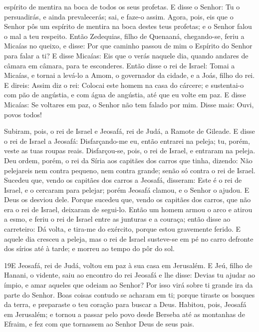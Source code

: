 espírito de mentira na boca de todos os seus profetas. E disse o
Senhor: Tu o persuadirás, e ainda prevalecerás; sai, e faze-o assim.
Agora, pois, eis que o Senhor pôs um espírito de mentira na
boca destes teus profetas; e o Senhor falou o mal a teu respeito.
Então Zedequias, filho de Quenaaná, chegando-se, feriu a
Micaías no queixo, e disse: Por que caminho passou de mim o Espírito
do Senhor para falar a ti? E disse Micaías: Eis que o verás
naquele dia, quando andares de câmara em câmara, para te esconderes.
 Então disse o rei de Israel: Tomai a Micaías, e tornai a levá-lo
a Amom, o governador da cidade, e a Joás, filho do rei. E
direis: Assim diz o rei: Colocai este homem na casa do cárcere; e
sustentai-o com pão de angústia, e com água de angústia, até que eu
volte em paz. E disse Micaías: Se voltares em paz, o Senhor
não tem falado por mim. Disse mais: Ouvi, povos todos!

Subiram, pois, o rei de Israel e Jeosafá, rei de Judá, a Ramote
de Gileade. E disse o rei de Israel a Jeosafá: Disfarçando-me
eu, então entrarei na peleja; tu, porém, veste as tuas roupas reais.
Disfarçou-se, pois, o rei de Israel, e entraram na peleja.
Deu ordem, porém, o rei da Síria aos capitães dos carros que
tinha, dizendo: Não pelejareis nem contra pequeno, nem contra
grande; senão só contra o rei de Israel. Sucedeu que, vendo
os capitães dos carros a Jeosafá, disseram: Este é o rei de Israel,
e o cercaram para pelejar; porém Jeosafá clamou, e o Senhor o
ajudou. E Deus os desviou dele. Porque sucedeu que, vendo os
capitães dos carros, que não era o rei de Israel, deixaram de
segui-lo. Então um homem armou o arco e atirou a esmo, e
feriu o rei de Israel entre as junturas e a couraça; então disse ao
carreteiro: Dá volta, e tira-me do exército, porque estou gravemente
ferido. E aquele dia cresceu a peleja, mas o rei de Israel
susteve-se em pé no carro defronte dos sírios até à tarde; e morreu
ao tempo do pôr do sol.

\medskip

\lettrine{19} E Jeosafá, rei de Judá, voltou em paz à sua casa
em Jerusalém. E Jeú, filho de Hanani, o vidente, saiu ao
encontro do rei Jeosafá e lhe disse: Devias tu ajudar ao ímpio, e
amar aqueles que odeiam ao Senhor? Por isso virá sobre ti grande ira
da parte do Senhor. Boas coisas contudo se acharam em ti; porque
tiraste os bosques da terra, e preparaste o teu coração para buscar
a Deus. Habitou, pois, Jeosafá em Jerusalém; e tornou a passar
pelo povo desde Berseba até as montanhas de Efraim, e fez com que
tornassem ao Senhor Deus de seus pais.

